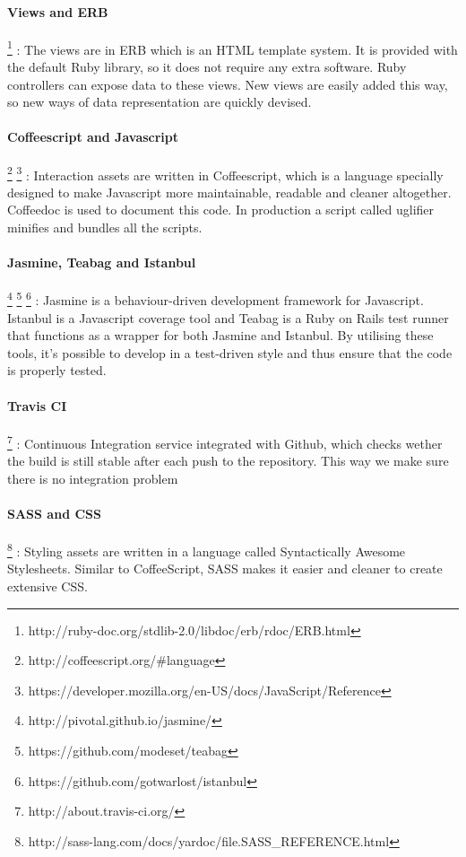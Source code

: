 \documentclass{report}
\begin{document}
				\paragraph{Views and ERB} \footnote{http://ruby-doc.org/stdlib-2.0/libdoc/erb/rdoc/ERB.html}
					: The views are in ERB which is an HTML template system. It is provided with the default Ruby library, so it does not require any extra software. Ruby controllers can expose data to these views. New views are easily added this way, so new ways of data representation are quickly devised.
				\paragraph{Coffeescript and Javascript} \footnote{http://coffeescript.org/\#language} \footnote{https://developer.mozilla.org/en-US/docs/JavaScript/Reference}
					: Interaction assets are written in Coffeescript, which is a language specially designed to make Javascript more maintainable, readable and cleaner altogether. Coffeedoc is used to document this code. In production a script called uglifier minifies and bundles all the scripts.
				\newpage
				\paragraph{Jasmine, Teabag and Istanbul} \footnote{http://pivotal.github.io/jasmine/} \footnote{https://github.com/modeset/teabag} \footnote{https://github.com/gotwarlost/istanbul}
					 : Jasmine is a behaviour-driven development framework for Javascript. Istanbul is a Javascript coverage tool and Teabag is a Ruby on Rails test runner that functions as a wrapper for both Jasmine and Istanbul. By utilising these tools, it's possible to develop in a test-driven style and thus ensure that the code is properly tested.
				\paragraph{Travis CI} \footnote{http://about.travis-ci.org/}
					: Continuous Integration service integrated with Github, which checks wether the build is still stable after each push to the repository. This way we make sure there is no integration problem
				\paragraph{SASS and CSS} 
				\footnote{http://sass-lang.com/docs/yardoc/file.SASS\_REFERENCE.html}
					: Styling assets are written in a language called Syntactically Awesome Stylesheets. Similar to CoffeeScript, SASS makes it easier and cleaner to create extensive CSS. 
\end{document}
